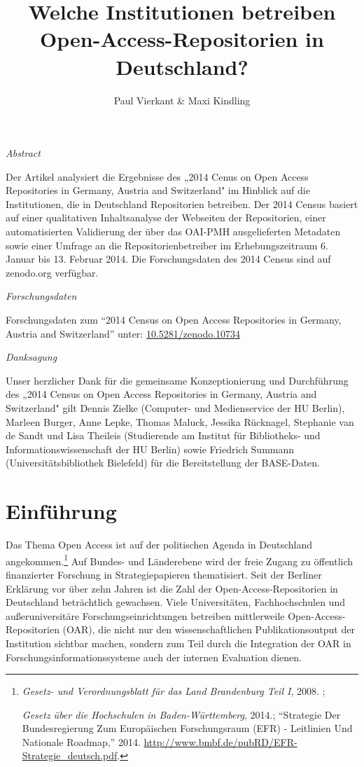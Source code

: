\documentclass[a4paper,
fontsize=11pt,
oneside,
numbers=noperiodatend,
parskip=half-,
bibliography=totoc,
final
]{scrartcl}
\title{\LARGE{Welche Institutionen betreiben Open-Access-Repositorien in Deutschland?}} %
\author{Paul Vierkant \& Maxi Kindling} %
\date{}
\begin{document}
\maketitle
\thispagestyle{fancyplain} 



\emph{Abstract}

Der Artikel analysiert die Ergebnisse des „2014 Cenus on Open Access
Repositories in Germany, Austria and Switzerland" im Hinblick auf die
Institutionen, die in Deutschland Repositorien betreiben. Der 2014
Census basiert auf einer qualitativen Inhaltsanalyse der Webseiten der
Repositorien, einer automatisierten Validierung der über das OAI-PMH
ausgelieferten Metadaten sowie einer Umfrage an die
Repositorienbetreiber im Erhebungszeitraum 6. Januar bis 13. Februar
2014. Die Forschungsdaten des 2014 Census sind auf zenodo.org verfügbar.

\emph{Forschungsdaten}

Forschungsdaten zum ``2014 Census on Open Access Repositories in
Germany, Austria and Switzerland'' unter:
\href{http://doi.org/10.5281/zenodo.10734}{10.5281/zenodo.10734}

\emph{Danksagung}

Unser herzlicher Dank für die gemeinsame Konzeptionierung und
Durchführung des „2014 Census on Open Access Repositories in Germany,
Austria and Switzerland" gilt Dennis Zielke (Computer- und Medienservice
der HU Berlin), Marleen Burger, Anne Lepke, Thomas Maluck, Jessika
Rücknagel, Stephanie van de Sandt und Lisa Theileis (Studierende am
Institut für Bibliotheks- und Informationswissenschaft der HU Berlin)
sowie Friedrich Summann (Universitätsbibliothek Bielefeld) für die
Bereitstellung der BASE-Daten.

\section*{Einführung}\label{einfuxfchrung}

Das Thema Open Access ist auf der politischen Agenda in Deutschland
angekommen.\footnote{\emph{Gesetz- und Verordnungsblatt für das Land
  Brandenburg Teil I}, 2008. ;

  \emph{Gesetz über die Hochschulen in Baden-Württemberg}, 2014.;
  \enquote{Strategie Der Bundesregierung Zum Europäischen Forschungsraum
  (EFR) - Leitlinien Und Nationale Roadmap,} 2014.
  \url{http://www.bmbf.de/pubRD/EFR-Strategie_deutsch.pdf}.} Auf Bundes-
und Länderebene wird der freie Zugang zu öffentlich finanzierter
Forschung in Strategiepapieren thematisiert. Seit der Berliner Erklärung
vor über zehn Jahren ist die Zahl der Open-Access-Repositorien in
Deutschland beträchtlich gewachsen. Viele Universitäten, Fachhochschulen
und außeruniversitäre Forschungseinrichtungen betreiben mittlerweile
Open-Access-Repositorien (OAR), die nicht nur den wissenschaftlichen
Publikationsoutput der Institution sichtbar machen, sondern zum Teil
durch die Integration der OAR in Forschungsinformationssysteme auch der
internen Evaluation dienen.
\end{document}
